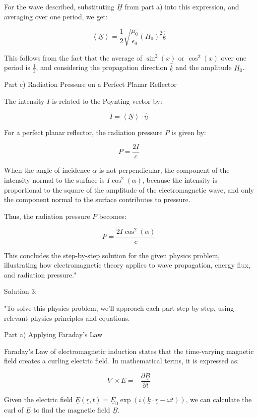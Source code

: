 For the wave described, substituting \(\underline{H}\) from part a) into this expression, and averaging over one period, we get:

\[
\left< \underline{N} \right> = \frac{1}{2} \sqrt{\frac{\mu_{0}}{\epsilon_{0}}} (H_{0})^{2} \hat{\underline{k}}
\]

This follows from the fact that the average of \(\sin^2(x)\) or \(\cos^2(x)\) over one period is \(\frac{1}{2}\), and considering the propagation direction \(\hat{\underline{k}}\) and the amplitude \(H_{0}\).

Part c) Radiation Pressure on a Perfect Planar Reflector

The intensity \(I\) is related to the Poynting vector by:

\[
I = \left< \underline{N} \right> \cdot \hat{\underline{n}}
\]

For a perfect planar reflector, the radiation pressure \(P\) is given by:

\[
P = \frac{2I}{c}
\]

When the angle of incidence \(\alpha\) is not perpendicular, the component of the intensity normal to the surface is \(I \cos^2(\alpha)\), because the intensity is proportional to the square of the amplitude of the electromagnetic wave, and only the component normal to the surface contributes to pressure.

Thus, the radiation pressure \(P\) becomes:

\[
P = \frac{2I\cos^2(\alpha)}{c}
\]

This concludes the step-by-step solution for the given physics problem, illustrating how electromagnetic theory applies to wave propagation, energy flux, and radiation pressure."

Solution 3: 

"To solve this physics problem, we'll approach each part step by step, using relevant physics principles and equations.

Part a) Applying Faraday's Law

Faraday's Law of electromagnetic induction states that the time-varying magnetic field creates a curling electric field. In mathematical terms, it is expressed as:

\[
\nabla \times \underline{E} = - \frac{\partial \underline{B}}{\partial t}
\]

Given the electric field \(\underline{E}(\underline{r}, t) = \underline{E}_{0} \exp (i(\underline{k} \cdot \underline{r} - \omega t))\), we can calculate the curl of \(\underline{E}\) to find the magnetic field \(\underline{B}\).

